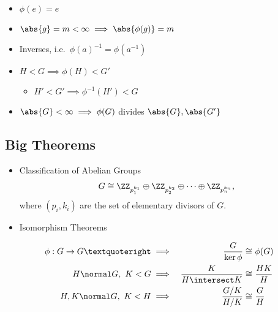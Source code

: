 \begin{itemize}
  \begin{itemize}
  \tightlist
  \item
    \(\phi(e) = e\)
  \item
    \(\abs{g} = m < \infty \implies \abs{\phi(g)} = m\)
  \item
    Inverses, i.e.~\(\phi(a)^{-1} = \phi(a^{-1})\)
  \item
    \(H < G \implies \phi(H) < G'\)

    \begin{itemize}
    \tightlist
    \item
      \(H' < G' \implies \phi^{-1}(H') < G\)
    \end{itemize}
  \item
    \(\abs{G} < \infty \implies \phi(G)\) divides \(\abs{G}, \abs{G'}\)
  \end{itemize}
\end{itemize}

\hypertarget{big-theorems-2}{%
\subsection{Big Theorems}\label{big-theorems-2}}

\begin{itemize}
\item
  Classification of Abelian Groups
  \begin{align*}  
  G \cong \ZZ_{p_1^{k_1}} \oplus \ZZ_{p_2^{k_2}} \oplus \cdots \oplus \ZZ_{p_n^{k_n}}
  ,\end{align*} where \((p_i, k_i)\) are the set of elementary divisors
  of \(G\).
\item
  Isomorphism Theorems
\end{itemize}

\begin{align*}
\phi: G \to G’ \implies             && \frac{G}{\ker{\phi}} \cong       &~ \phi(G) \\
H \normal G,~ K < G \implies        && \frac{K}{H\intersect K} \cong    &~ \frac{HK}{H} \\
H,K \normal G,~ K < H \implies  && \frac{G/K}{H/K} \cong            &~ \frac{G}{H}
\end{align*}

